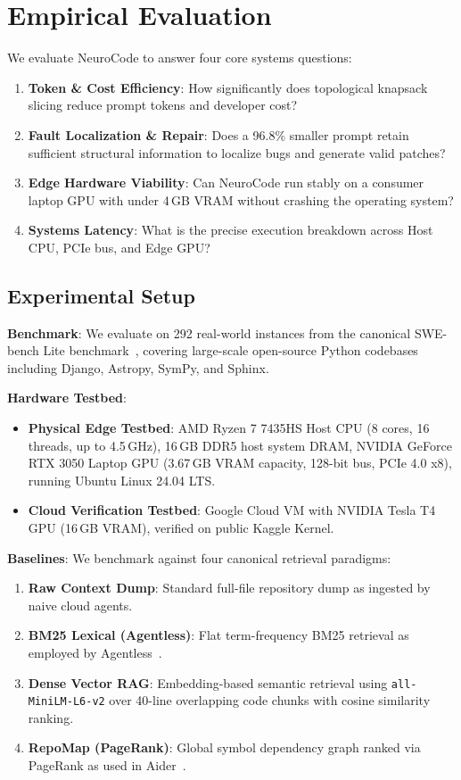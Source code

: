 \section{Empirical Evaluation}
\label{sec:eval}

We evaluate NeuroCode to answer four core systems questions:
\begin{enumerate}
    \item \textbf{Token \& Cost Efficiency}: How significantly does topological knapsack slicing reduce prompt tokens and developer cost?
    \item \textbf{Fault Localization \& Repair}: Does a 96.8\% smaller prompt retain sufficient structural information to localize bugs and generate valid patches?
    \item \textbf{Edge Hardware Viability}: Can NeuroCode run stably on a consumer laptop GPU with under 4\,GB VRAM without crashing the operating system?
    \item \textbf{Systems Latency}: What is the precise execution breakdown across Host CPU, PCIe bus, and Edge GPU?
\end{enumerate}

\subsection{Experimental Setup}

\textbf{Benchmark}: We evaluate on 292 real-world instances from the canonical SWE-bench Lite benchmark~\cite{jimenez2024swebench}, covering large-scale open-source Python codebases including Django, Astropy, SymPy, and Sphinx.

\textbf{Hardware Testbed}:
\begin{itemize}
    \item \textbf{Physical Edge Testbed}: AMD Ryzen 7 7435HS Host CPU (8 cores, 16 threads, up to 4.5\,GHz), 16\,GB DDR5 host system DRAM, NVIDIA GeForce RTX 3050 Laptop GPU (3.67\,GB VRAM capacity, 128-bit bus, PCIe 4.0 x8), running Ubuntu Linux 24.04 LTS.
    \item \textbf{Cloud Verification Testbed}: Google Cloud VM with NVIDIA Tesla T4 GPU (16\,GB VRAM), verified on public Kaggle Kernel.
\end{itemize}

\textbf{Baselines}: We benchmark against four canonical retrieval paradigms:
\begin{enumerate}
    \item \textbf{Raw Context Dump}: Standard full-file repository dump as ingested by naive cloud agents.
    \item \textbf{BM25 Lexical (Agentless)}: Flat term-frequency BM25 retrieval as employed by Agentless~\cite{xia2024agentless}.
    \item \textbf{Dense Vector RAG}: Embedding-based semantic retrieval using \texttt{all-MiniLM-L6-v2} over 40-line overlapping code chunks with cosine similarity ranking.
    \item \textbf{RepoMap (PageRank)}: Global symbol dependency graph ranked via PageRank as used in Aider~\cite{aider2024repomap}.
\end{enumerate}


